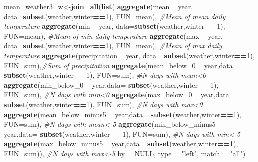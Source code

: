 \documentclass[10pt,]{article}
\newenvironment{Shaded}{\begin{snugshade}}{\end{snugshade}}
\newcommand{\KeywordTok}[1]{\textcolor[rgb]{0.13,0.29,0.53}{\textbf{#1}}}
\newcommand{\DataTypeTok}[1]{\textcolor[rgb]{0.13,0.29,0.53}{#1}}
\newcommand{\DecValTok}[1]{\textcolor[rgb]{0.00,0.00,0.81}{#1}}
\newcommand{\StringTok}[1]{\textcolor[rgb]{0.31,0.60,0.02}{#1}}
\newcommand{\CommentTok}[1]{\textcolor[rgb]{0.56,0.35,0.01}{\textit{#1}}}
\newcommand{\OtherTok}[1]{\textcolor[rgb]{0.56,0.35,0.01}{#1}}
\newcommand{\OperatorTok}[1]{\textcolor[rgb]{0.81,0.36,0.00}{\textbf{#1}}}
\newcommand{\NormalTok}[1]{#1}
\begin{document}
\begin{Shaded}
\begin{Highlighting}[]
\NormalTok{mean_weather3_w<-}\KeywordTok{join_all}\NormalTok{(}\KeywordTok{list}\NormalTok{(}
    \KeywordTok{aggregate}\NormalTok{(mean }\OperatorTok{~}\StringTok{ }\NormalTok{year, }\DataTypeTok{data=}\KeywordTok{subset}\NormalTok{(weather,winter}\OperatorTok{==}\DecValTok{1}\NormalTok{), }\DataTypeTok{FUN=}\NormalTok{mean),   }\CommentTok{#Mean of mean daily temperature}
    \KeywordTok{aggregate}\NormalTok{(min }\OperatorTok{~}\StringTok{ }\NormalTok{year, }\DataTypeTok{data=}\KeywordTok{subset}\NormalTok{(weather,winter}\OperatorTok{==}\DecValTok{1}\NormalTok{), }\DataTypeTok{FUN=}\NormalTok{mean),    }\CommentTok{#Mean of min daily temperature}
    \KeywordTok{aggregate}\NormalTok{(max }\OperatorTok{~}\StringTok{ }\NormalTok{year, }\DataTypeTok{data=}\KeywordTok{subset}\NormalTok{(weather,winter}\OperatorTok{==}\DecValTok{1}\NormalTok{), }\DataTypeTok{FUN=}\NormalTok{mean),    }\CommentTok{#Mean of max daily temperature}
    \KeywordTok{aggregate}\NormalTok{(precipitation }\OperatorTok{~}\StringTok{ }\NormalTok{year, }\DataTypeTok{data=} \KeywordTok{subset}\NormalTok{(weather,winter}\OperatorTok{==}\DecValTok{1}\NormalTok{), }\DataTypeTok{FUN=}\NormalTok{sum),}\CommentTok{#Sum of precipitation}
    \KeywordTok{aggregate}\NormalTok{(mean_below_}\DecValTok{0} \OperatorTok{~}\StringTok{ }\NormalTok{year,}\DataTypeTok{data=} \KeywordTok{subset}\NormalTok{(weather,winter}\OperatorTok{==}\DecValTok{1}\NormalTok{), }\DataTypeTok{FUN=}\NormalTok{sum),  }\CommentTok{#N days with mean<0}
    \KeywordTok{aggregate}\NormalTok{(min_below_}\DecValTok{0} \OperatorTok{~}\StringTok{ }\NormalTok{year,}\DataTypeTok{data=} \KeywordTok{subset}\NormalTok{(weather,winter}\OperatorTok{==}\DecValTok{1}\NormalTok{), }\DataTypeTok{FUN=}\NormalTok{sum),  }\CommentTok{#N days with min<0}
    \KeywordTok{aggregate}\NormalTok{(max_below_}\DecValTok{0} \OperatorTok{~}\StringTok{ }\NormalTok{year,}\DataTypeTok{data=} \KeywordTok{subset}\NormalTok{(weather,winter}\OperatorTok{==}\DecValTok{1}\NormalTok{), }\DataTypeTok{FUN=}\NormalTok{sum),  }\CommentTok{#N days with max<0}
    \KeywordTok{aggregate}\NormalTok{(mean_below_minus5 }\OperatorTok{~}\StringTok{ }\NormalTok{year,}\DataTypeTok{data=} \KeywordTok{subset}\NormalTok{(weather,winter}\OperatorTok{==}\DecValTok{1}\NormalTok{), }\DataTypeTok{FUN=}\NormalTok{sum), }\CommentTok{#N days with mean<-5}
    \KeywordTok{aggregate}\NormalTok{(min_below_minus5 }\OperatorTok{~}\StringTok{ }\NormalTok{year,}\DataTypeTok{data=} \KeywordTok{subset}\NormalTok{(weather,winter}\OperatorTok{==}\DecValTok{1}\NormalTok{), }\DataTypeTok{FUN=}\NormalTok{sum),  }\CommentTok{#N days with min<-5}
    \KeywordTok{aggregate}\NormalTok{(max_below_minus5 }\OperatorTok{~}\StringTok{ }\NormalTok{year,}\DataTypeTok{data=} \KeywordTok{subset}\NormalTok{(weather,winter}\OperatorTok{==}\DecValTok{1}\NormalTok{), }\DataTypeTok{FUN=}\NormalTok{sum)), }\CommentTok{#N days with max<-5}
    \DataTypeTok{by =} \OtherTok{NULL}\NormalTok{, }\DataTypeTok{type =} \StringTok{"left"}\NormalTok{, }\DataTypeTok{match =} \StringTok{"all"}\NormalTok{)}
\end{Highlighting}
\end{Shaded}
\end{document}
